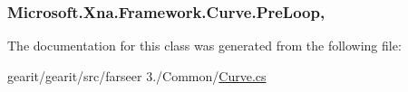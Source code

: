\hypertarget{class_microsoft_1_1_xna_1_1_framework_1_1_curve_a61805aea42d5aba97cd624e25c1162f7}{
\subsubsection[{Pre\+Loop}]{ Microsoft.\+Xna.\+Framework.\+Curve.\+Pre\+Loop\hspace{0.3cm}{\ttfamily [get]}, {\ttfamily [set]}}}\label{class_microsoft_1_1_xna_1_1_framework_1_1_curve_a61805aea42d5aba97cd624e25c1162f7}


The documentation for this class was generated from the following file\+:\begin{DoxyCompactItemize}
\item 
gearit/gearit/src/farseer 3./\+Common/\hyperlink{_curve_8cs}{Curve.\+cs}\end{DoxyCompactItemize}
